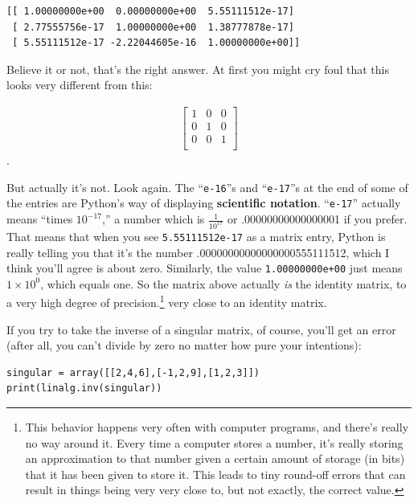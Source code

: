 \begin{Verbatim}[fontsize=\small,samepage=true,frame=leftline,framesep=5mm,framerule=1mm]
[[ 1.00000000e+00  0.00000000e+00  5.55111512e-17]
 [ 2.77555756e-17  1.00000000e+00  1.38777878e-17]
 [ 5.55111512e-17 -2.22044605e-16  1.00000000e+00]]
\end{Verbatim}

Believe it or not, that's the right answer. At first you might cry foul that
this looks very different from this:

\vspace{-.25in}
\begin{align*}
\begin{bmatrix}
1 & 0 & 0 \\
0 & 1 & 0 \\
0 & 0 & 1 \\
\end{bmatrix}
\end{align*}.
\vspace{-.15in}


But actually it's not. Look again. The ``\texttt{e-16}''s and
``\texttt{e-17}''s at the end of some of the entries are Python's way of
displaying \textbf{scientific notation}. ``\texttt{e-17}'' actually means
``times $10^{-17}$,'' a number which is $\frac{1}{10^{17}}$ or
.00000000000000001 if you prefer. That means that when you see
\texttt{5.55111512e-17} as a matrix entry, Python is really telling you that
it's the number .00000000000000000555111512, which I think you'll agree is
about zero. Similarly, the value \texttt{1.00000000e+00} just means $1\times
10^0$, which equals one. So the matrix above actually \textit{is} the identity
matrix, to a very high degree of precision.\footnote{This behavior happens very
often with computer programs, and there's really no way around it. Every time a
computer stores a number, it's really storing an approximation to that number
given a certain amount of storage (in bits) that it has been given to store it.
This leads to tiny round-off errors that can result in things being very very
close to, but not exactly, the correct value.}
very close to an identity matrix.

\medskip

If you try to take the inverse of a singular matrix, of course, you'll get an
error (after all, you can't divide by zero no matter how pure your intentions):

\begin{Verbatim}[fontsize=\small,samepage=true,frame=single,framesep=3mm]
singular = array([[2,4,6],[-1,2,9],[1,2,3]])
print(linalg.inv(singular))
\end{Verbatim}
\vspace{-.4in}

